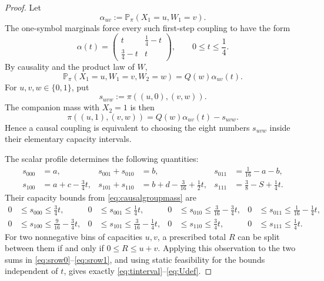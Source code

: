 \documentclass[11pt,a4paper]{article}
\theoremstyle{definition}
\theoremstyle{remark}
\newcommand{\Pp}{\mathbb P}
\newcommand{\bits}{\{0,1\}}
\begin{document}
\begin{proof}
Let
\[
 \alpha_{uv}:=\Pp_\pi(X_1=u,W_1=v).
\]
The one-symbol marginals force every such first-step coupling to have the form
\begin{equation}
 \alpha(t)=
 \begin{pmatrix}
 t&\frac14-t\\[1mm]
 \frac34-t&t
 \end{pmatrix},
 \qquad 0\le t\le\frac14.
 \label{eq:alphat}
\end{equation}
By causality and the product law of \(W\),
\begin{equation}
 \Pp_\pi(X_1=u,W_1=v,W_2=w)=Q(w)\alpha_{uv}(t).
 \label{eq:causalgroupmass}
\end{equation}
For \(u,v,w\in\bits\), put
\[
 s_{uvw}:=\pi((u,0),(v,w)).
\]
The companion mass with \(X_2=1\) is then
\begin{equation}
 \pi((u,1),(v,w))=Q(w)\alpha_{uv}(t)-s_{uvw}.
 \label{eq:companionmass}
\end{equation}
Hence a causal coupling is equivalent to choosing the eight numbers
\(s_{uvw}\) inside their elementary capacity intervals.

The scalar profile determines the following quantities:
\begin{align}
 s_{000}&=a,
 &s_{001}+s_{010}&=b,
 &s_{011}&=\frac1{16}-a-b,
 \label{eq:srow0}\\
 s_{100}&=a+c-\frac34t,
 &s_{101}+s_{110}&=b+d-\frac3{16}+\frac12t,
 &s_{111}&=\frac38-S+\frac14t.
 \label{eq:srow1}
\end{align}
Their capacity bounds from \eqref{eq:causalgroupmass} are
\begin{align*}
 0&\le s_{000}\le\frac34t,
 &0&\le s_{001}\le\frac14t,
 &0&\le s_{010}\le\frac3{16}-\frac34t,
 &0&\le s_{011}\le\frac1{16}-\frac14t,\\
 0&\le s_{100}\le\frac9{16}-\frac34t,
 &0&\le s_{101}\le\frac3{16}-\frac14t,
 &0&\le s_{110}\le\frac34t,
 &0&\le s_{111}\le\frac14t.
\end{align*}
For two nonnegative bins of capacities \(u,v\), a prescribed total \(R\)
can be split between them if and only if \(0\le R\le u+v\).  Applying this
observation to the two sums in \eqref{eq:srow0}--\eqref{eq:srow1}, and using
static feasibility for the bounds independent of \(t\), gives exactly
\eqref{eq:tinterval}--\eqref{eq:Udef}.


\end{proof}
\end{document}
